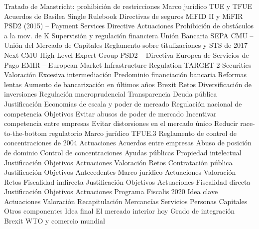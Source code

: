 \documentclass{nuevotema}
\begin{document}
\begin{esquema}[enumerate]
			\3 Tratado de Maastricht: prohibición de restricciones
		\2 Marco jurídico
			\3 TUE y TFUE
			\3 Acuerdos de Basilea
			\3 Single Rulebook
			\3 Directivas de seguros
			\3 MiFID II y MiFIR
			\3 PSD2 (2015) -- Payment Services Directive
		\2 Actuaciones
			\3 Prohibición de obstáculos a la mov. de K
			\3 Supervisión y regulación financiera
			\3 Unión Bancaria
			\3 SEPA
			\3 CMU -- Unión del Mercado de Capitales
			\3 Reglamento sobre titulizaciones y STS de 2017
			\3 Next CMU High-Level Expert Group
			\3 PSD2 -- Directiva Europea de Servicios de Pago
			\3 EMIR -- European Market Infrastructure Regulation
			\3 TARGET 2-Securities
		\2 Valoración
			\3 Excesiva intermediación
			\3 Predominio financiación bancaria
			\3 Reformas lentas
			\3 Aumento de bancarización en últimos años
			\3 Brexit
		\2 Retos
			\3 Diversificación de inversiones
			\3 Regulación macroprudencial
			\3 Transparencia
			\3 Deuda pública
	\1 
		\2 Justificación
			\3 Economías de escala y poder de mercado
			\3 Regulación nacional de competencia
		\2 Objetivos
			\3 Evitar abusos de poder de mercado
			\3 Incentivar competencia entre empresas
			\3 Evitar distorsiones en el mercado único
			\3 Reducir race-to-the-bottom regulatorio
		\2 Marco jurídico
			\3 TFUE.3
			\3 Reglamento de control de concentraciones de 2004
		\2 Actuaciones
			\3 Acuerdos entre empresas
			\3 Abuso de posición de dominio
			\3 Control de concentraciones
			\3 Ayudas públicas
	\1 
		\2 Propiedad intelectual
			\3 Justificación
			\3 Objetivos
			\3 Actuaciones
			\3 Valoración
			\3 Retos
		\2 Contratación pública
			\3 Justificación
			\3 Objetivos
			\3 Antecedentes
			\3 Marco jurídico
			\3 Actuaciones
			\3 Valoración
			\3 Retos
		\2 Fiscalidad indirecta
			\3 Justificación
			\3 Objetivos
			\3 Actuaciones
		\2 Fiscalidad directa
			\3 Justificación
			\3 Objetivos
			\3 Actuaciones
		\2 Programa Fiscalis 2020
			\3 Idea clave
			\3 Actuaciones
			\3 Valoración
	\1[] 
		\2 Recapitulación
			\3 Mercancías
			\3 Servicios
			\3 Personas
			\3 Capitales
			\3 Otros componentes
		\2 Idea final
			\3 El mercado interior hoy
			\3 Grado de integración
			\3 Brexit
			\3 WTO y comercio mundial

\end{esquema}
\end{document}
